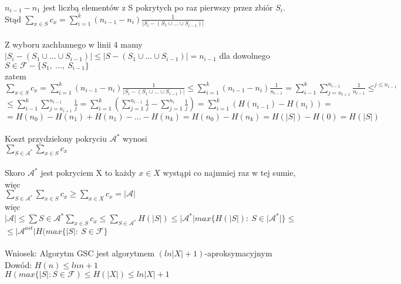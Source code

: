 $n_{i-1} - n_1$ jest liczbą elementów z S pokrytych po raz pierwszy przez zbiór $S_i$.
Stąd $\sum_{x\in S}c_x = \sum_{i=1}^{k}(n_{i-1}-n_i)\frac{1}{\vert S_i - (S_1 \cup ... \cup S_{i-1})\vert}$\\\\
Z wyboru zachłannego w linii 4 mamy $\vert S_i - (S_1 \cup ... \cup S_{i-1})\vert \leq \vert S - (S_1 \cup ... \cup S_{i-1})\vert = n_{i-1}$ dla dowolnego $S \in \mathcal{F} - \lbrace S_1,\ ...,\ S_{i-1}\rbrace$\\
\tab zatem\\
$\sum_{x\in S} c_x = \sum_{i=1}^{k} (n_{i-1}-n_i)\frac{1}{\vert S_i - (S_1 \cup ... \cup S_{i-1})\vert} \leq \sum_{i=1}^{k}(n_{i-1}- n_i)\frac{1}{n_{i-1}}=\sum_{i-1}^{k}\sum_{j=n_{i+1}}^{n_{i-1}}\frac{1}{n_{i-1}}\leq^{j\leq n_{i-1}}$\\
$\leq \sum_{i-1}^{k}\sum_{j=n_{i+1}}^{n_{i-1}}\frac{1}{j}=\sum_{i=1}^{k}(\sum_{j=1}^{n_{i-1}} \frac{1}{j}- \sum_{j=1}^{n_i} \frac{1}{j}) = \sum_{i=1}^{k} (H(n_{i-1}) - H(n_i)) = $\\
$ = H(n_0) - H(n_1) + H(n_1) - ... - H(n_k) = H(n_0) - H(n_k) = H(\vert S\vert ) - H(0) = H(\vert S\vert )$\\\\
Koszt przydzielony pokryciu $\mathcal{A}^{\ast}$ wynosi \\
\tab $\sum_{S\in \mathcal{A}^{\ast}}\sum_{x\in S}c_x$\\\\
Skoro $\mathcal{A}^{\ast}$ jest pokryciem X to każdy $x \in X$ wystąpi co najmniej raz w tej sumie,\\
więc\\
\tab $\sum_{S\in \mathcal{A}^{\ast}}\sum_{x\in S}c_x \geq \sum_{x\in X}c_x = \vert \mathcal{A}\vert$\\
więc\\
\tab $\vert \mathcal{A}\vert \leq \sum{S\in \mathcal{A}^{\ast}}\sum_{x\in S}c_x \leq \sum_{S\in \mathcal{A}^{\ast}}H(\vert S\vert )\leq \vert \mathcal{A}^{\ast}\vert max\lbrace H(\vert S\vert):\ S\in \vert \mathcal{A}^{\ast}\vert\rbrace\leq$\\
\tab $\leq\vert\mathcal{A}^{ast}\vert H(max\lbrace\vert S\vert :\ S\in \mathcal{F}\rbrace$\\\\
Wniosek: Algorytm GSC jest algorytmem $(ln\vert X \vert + 1)$-aproksymacyjnym\\
Dowód: $H(n)\leq lnn+1$\\
\tab $H(max\lbrace\vert S\vert :S\in \mathcal{F})\leq H(\vert X\vert )\leq ln\vert X\vert + 1$